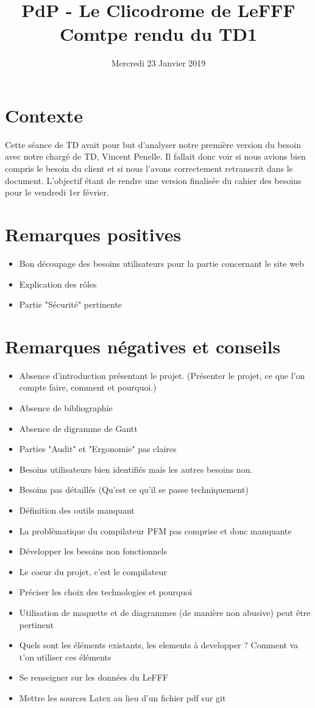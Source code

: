 \documentclass{article}
\title{PdP - Le Clicodrome de LeFFF \\ Comtpe rendu du TD1}
\author{}
\date{Mercredi 23 Janvier 2019}
\begin{document}
\maketitle

\section{Contexte}
Cette séance de TD avait pour but d'analyser notre première version du besoin avec notre chargé de TD, Vincent Penelle. Il fallait donc voir si nous avions bien compris le besoin du client et si nous l'avons correctement retranscrit dans le document.
L'objectif étant de rendre une version finalisée du cahier des besoins pour le vendredi 1er février.


\section{Remarques positives}
\begin{itemize}
    \item Bon découpage des besoins utilisateurs pour la partie concernant le site web
    \item Explication des rôles 
    \item Partie "Sécurité" pertinente
\end{itemize}

\section{Remarques négatives et conseils}
\begin{itemize}
    \item Absence d'introduction présentant le projet. (Présenter le projet, ce que l'on compte faire, comment et pourquoi.)
    \item Absence de bibliographie
    \item Absence de digramme de Gantt
    \item Parties "Audit" et "Ergonomie" pas claires
    \item Besoins utilisateurs bien identifiés mais les autres besoins non.
    \item Besoins pas détaillés (Qu'est ce qu'il se passe techniquement)
    \item Définition des outils manquant
    \item La problèmatique du compilateur PFM pas comprise et donc manquante
    \item Développer les besoins non fonctionnels
    \item Le coeur du projet, c'est le compilateur
    \item Préciser les choix des technologies et pourquoi
    \item Utilisation de maquette et de diagrammes (de manière non abusive) peut être pertinent
    \item Quels sont les éléments existants, les elements à developper ? Comment va t'on utiliser ces éléments
    \item Se renseigner sur les données du LeFFF
    \item Mettre les sources Latex au lieu d'un fichier pdf sur git 
\end{itemize}
\end{document}
